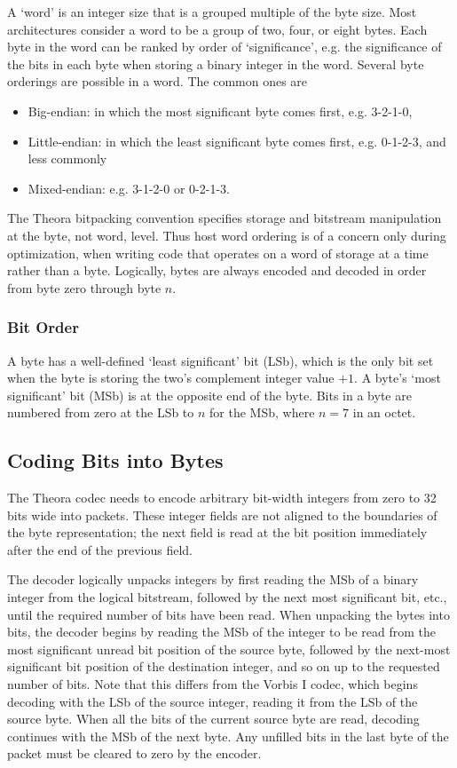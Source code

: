 \documentclass[11pt,letterpaper]{article}
\begin{document}
A `word' is an integer size that is a grouped multiple of the byte size.
Most architectures consider a word to be a group of two, four, or eight bytes.
Each byte in the word can be ranked by order of `significance', e.g. the
 significance of the bits in each byte when storing a binary integer in the
 word.
Several byte orderings are possible in a word.
The common ones are
\begin{itemize}
\item{Big-endian:}
in which the most significant byte comes first, e.g. 3-2-1-0,
\item{Little-endian:}
in which the least significant byte comes first, e.g. 0-1-2-3, and less
 commonly
\item{Mixed-endian:}
e.g. 3-1-2-0 or 0-2-1-3.
\end{itemize}

The Theora bitpacking convention specifies storage and bitstream manipulation
 at the byte, not word, level.
Thus host word ordering is of a concern only during optimization, when writing
 code that operates on a word of storage at a time rather than a byte.
Logically, bytes are always encoded and decoded in order from byte zero through
 byte $n$.

\subsubsection{Bit Order}

A byte has a well-defined `least significant' bit (LSb), which is the only bit
 set when the byte is storing the two's complement integer value $+1$.
A byte's `most significant' bit (MSb) is at the opposite end of the byte.
Bits in a byte are numbered from zero at the LSb to $n$ for the MSb, where
 $n=7$ in an octet.

\subsection{Coding Bits into Bytes}

The Theora codec needs to encode arbitrary bit-width integers from zero to 32
 bits wide into packets.
These integer fields are not aligned to the boundaries of the byte
 representation; the next field is read at the bit position immediately
 after the end of the previous field.

The decoder logically unpacks integers by first reading the MSb of a binary
 integer from the logical bitstream, followed by the next most significant
 bit, etc., until the required number of bits have been read.
When unpacking the bytes into bits, the decoder begins by reading the MSb of
 the integer to be read from the most significant unread bit position of the
 source byte, followed by the next-most significant bit position of the
 destination integer, and so on up to the requested number of bits.
Note that this differs from the Vorbis I codec, which
 begins decoding with the LSb of the source integer, reading it from the
 LSb of the source byte.
When all the bits of the current source byte are read, decoding continues with
 the MSb of the next byte.
Any unfilled bits in the last byte of the packet must be cleared to zero by the
 encoder.
\end{document}
